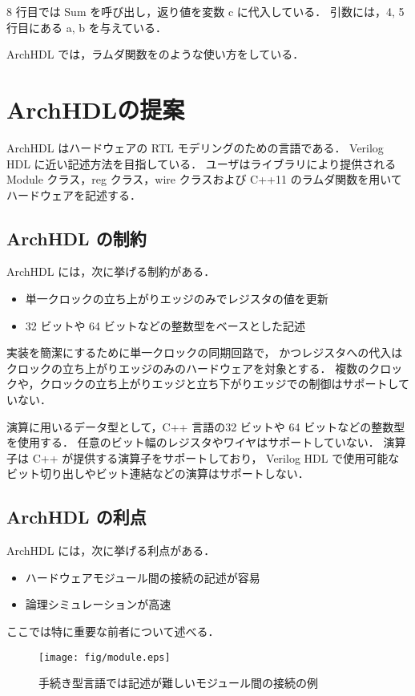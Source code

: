 \documentclass[submit,techreq,noauthor]{ipsj}
\begin{document}
8 行目では Sum を呼び出し，返り値を変数 c に代入している．
引数には，4, 5 行目にある a, b を与えている．

ArchHDL では，ラムダ関数をのような使い方をしている．

\section{ArchHDLの提案}

ArchHDL はハードウェアの RTL モデリングのための言語である．
Verilog HDL に近い記述方法を目指している．
ユーザはライブラリにより提供される Module クラス，reg クラス，wire クラスおよび C++11 のラムダ関数を用いて
ハードウェアを記述する．

\subsection{ArchHDL の制約}
ArchHDL には，次に挙げる制約がある．
\begin{itemize}
 \item 単一クロックの立ち上がりエッジのみでレジスタの値を更新
 \item 32 ビットや 64 ビットなどの整数型をベースとした記述
\end{itemize}

実装を簡潔にするために単一クロックの同期回路で，
かつレジスタへの代入はクロックの立ち上がりエッジのみのハードウェアを対象とする．
複数のクロックや，クロックの立ち上がりエッジと立ち下がりエッジでの制御はサポートしていない．

演算に用いるデータ型として，C++ 言語の32 ビットや 64 ビットなどの整数型を使用する．
任意のビット幅のレジスタやワイヤはサポートしていない．
演算子は C++ が提供する演算子をサポートしており，
Verilog HDL で使用可能なビット切り出しやビット連結などの演算はサポートしない．

\subsection{ArchHDL の利点}
ArchHDL には，次に挙げる利点がある．
\begin{itemize}
 \item ハードウェアモジュール間の接続の記述が容易
 \item 論理シミュレーションが高速
\end{itemize}
ここでは特に重要な前者について述べる．

\begin{figure}[t]
 \begin{center}
  \texttt{[image: fig/module.eps]}
  \caption{手続き型言語では記述が難しいモジュール間の接続の例}
  \label{fig:module}
 \end{center}
\end{figure}
\end{document}
